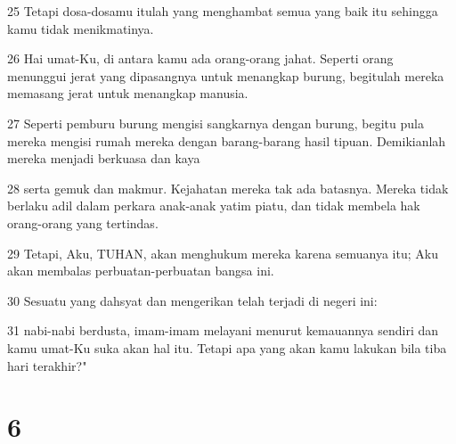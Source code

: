 \par 25 Tetapi dosa-dosamu itulah yang menghambat semua yang baik itu sehingga kamu tidak menikmatinya.
\par 26 Hai umat-Ku, di antara kamu ada orang-orang jahat. Seperti orang menunggui jerat yang dipasangnya untuk menangkap burung, begitulah mereka memasang jerat untuk menangkap manusia.
\par 27 Seperti pemburu burung mengisi sangkarnya dengan burung, begitu pula mereka mengisi rumah mereka dengan barang-barang hasil tipuan. Demikianlah mereka menjadi berkuasa dan kaya
\par 28 serta gemuk dan makmur. Kejahatan mereka tak ada batasnya. Mereka tidak berlaku adil dalam perkara anak-anak yatim piatu, dan tidak membela hak orang-orang yang tertindas.
\par 29 Tetapi, Aku, TUHAN, akan menghukum mereka karena semuanya itu; Aku akan membalas perbuatan-perbuatan bangsa ini.
\par 30 Sesuatu yang dahsyat dan mengerikan telah terjadi di negeri ini:
\par 31 nabi-nabi berdusta, imam-imam melayani menurut kemauannya sendiri dan kamu umat-Ku suka akan hal itu. Tetapi apa yang akan kamu lakukan bila tiba hari terakhir?"

\chapter{6}

